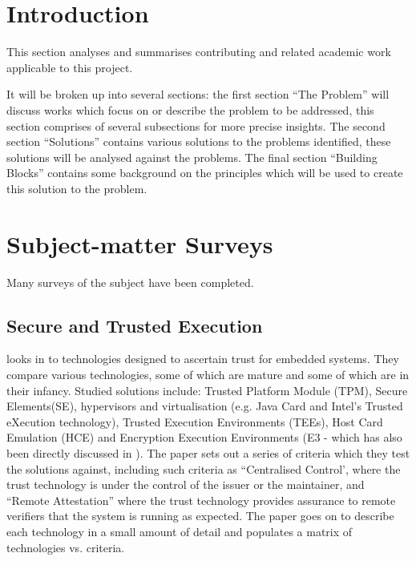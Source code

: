 \section{Introduction}

This section analyses and summarises contributing and related academic work applicable to this project.

It will be broken up into several sections: the first section ``The Problem'' will discuss works which focus on or describe the problem to be addressed, this section comprises of several subsections for more precise insights. The second section ``Solutions'' contains various solutions to the problems identified, these solutions will be analysed against the problems. The final section ``Building Blocks'' contains some background on the principles which will be used to create this solution to the problem. 

\section{Subject-matter Surveys}

Many surveys of the subject have been completed.

\subsection{Secure and Trusted Execution}

\cite{Shepherd2016} looks in to technologies designed to ascertain trust for embedded systems. They compare various technologies, some of which are mature and some of which are in their infancy. Studied solutions include: Trusted Platform Module (TPM), Secure Elements(SE), hypervisors and virtualisation (e.g. Java Card and Intel's Trusted eXecution technology), Trusted Execution Environments (TEEs), Host Card Emulation (HCE) and Encryption Execution Environments (E3 - which has also been directly discussed in \cite{Lee2016}). The paper sets out a series of criteria which they test the solutions against, including such criteria as ``Centralised Control', where the trust technology is under the control of the issuer or the maintainer, and ``Remote Attestation'' where the trust technology provides assurance to remote verifiers that the system is running as expected. The paper goes on to describe each technology in a small amount of detail and populates a matrix of technologies vs. criteria.


